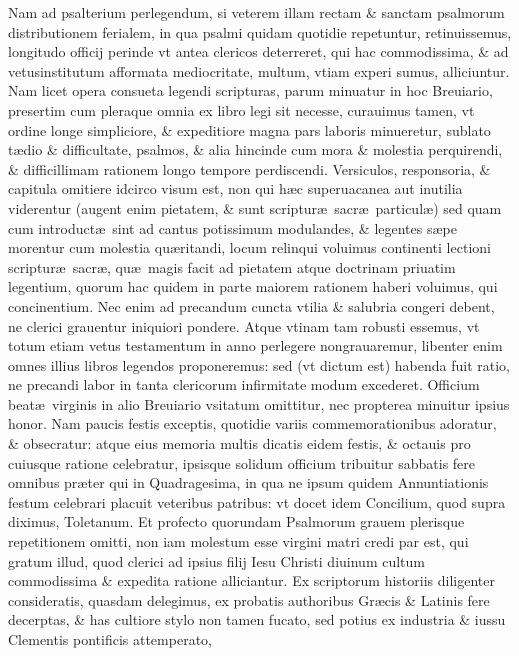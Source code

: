 \documentclass[a5paper,10pt]{book}
\def\ae{æ}
\begin{document}
Nam ad psalterium perlegendum, si veterem illam rectam \& sanctam psalmorum distributionem ferialem, in qua psalmi quidam quotidie repetuntur, retinuissemus, longitudo officij perinde vt antea clericos deterreret, qui hac commodissima, \& ad vetusinstitutum %
afformata mediocritate, multum, vtiam experi sumus, alliciuntur.
Nam licet opera consueta legendi scripturas, parum minuatur in hoc Breuiario, presertim cum pleraque omnia ex libro legi sit necesse, curauimus tamen, vt ordine longe simpliciore, \& expeditiore magna 
pars laboris minueretur, sublato t\ae dio \& difficultate, psalmos, \& alia hincinde cum mora \& molestia perquirendi, \& difficillimam rationem longo tempore perdiscendi.
Versiculos, responsoria, \& capitula omitiere %
idcirco visum est, non qui h\ae c superuacanea aut inutilia viderentur (augent enim pietatem, \& sunt scriptur\ae \ sacr\ae \ particul\ae ) sed quam %
cum introduct\ae \ sint ad cantus potissimum modulandes, \& legentes s\ae pe morentur cum molestia qu\ae ritandi, locum relinqui voluimus continenti lectioni scriptur\ae \ sacr\ae , qu\ae \ magis facit ad pietatem atque doctrinam priuatim legentium, quorum hac quidem in parte maiorem rationem haberi voluimus, qui concinentium.
Nec enim ad precandum cuncta vtilia \& salubria congeri debent, ne clerici grauentur iniquiori pondere.
Atque vtinam tam robusti essemus, vt totum etiam vetus testamentum in anno perlegere nongrauaremur, libenter enim omnes %
illius libros legendos proponeremus:
sed (vt dictum est) habenda fuit ratio, ne precandi labor in tanta clericorum infirmitate modum excederet.
Officium beat\ae \ virginis in alio Breuiario vsitatum omittitur, nec propterea minuitur ipsius honor.
Nam paucis festis exceptis, quotidie variis commemorationibus adoratur, \& obsecratur:
atque eius memoria multis dicatis eidem festis, \& octauis pro cuiusque ratione celebratur, ipsisque solidum officium tribuitur sabbatis fere omnibus pr\ae ter qui in Quadragesima, in qua ne ipsum quidem Annuntiationis festum celebrari placuit veteribus patribus:
vt docet idem Concilium, quod supra diximus, Toletanum.
Et profecto quorundam Psalmorum grauem plerisque repetitionem omitti, non iam molestum esse virgini matri credi par est, qui gratum illud, quod clerici ad ipsius filij Iesu Christi diuinum cultum commodissima \& expedita ratione alliciantur.
Ex scriptorum %
historiis diligenter consideratis, quasdam delegimus, ex probatis authoribus Gr\ae cis \& Latinis fere decerptas, \& has cultiore stylo non tamen fucato, sed potius ex industria \& iussu Clementis pontificis attemperato, %
\end{document}
